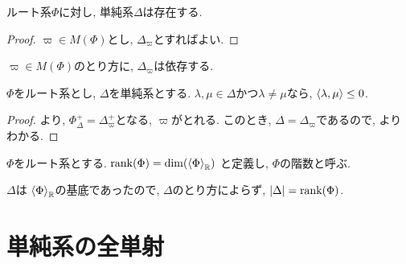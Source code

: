 \begin{cor}
  ルート系$\Phi$に対し, 単純系$\Delta$は存在する.
\end{cor}
\begin{proof}
  $\varpi\in M(\Phi)$とし, $\Delta_\varpi$とすればよい.
\end{proof}
\begin{remark}
  $\varpi\in M(\Phi)$のとり方に, $\Delta_\varpi$は依存する.
\end{remark}

\begin{theorem}
  $\Phi$をルート系とし,
  $\Delta$を単純系とする.
  $\lambda,\mu\in\Delta$かつ$\lambda\neq \mu$なら, $\Braket{\lambda,\mu}\leq 0$.
  
\end{theorem}
\begin{proof}
  より,
  $\Phi_\Delta^+=\Delta_\varpi^+$となる, $\varpi$がとれる.
  このとき, $\Delta=\Delta_\varpi$であるので,
  よりわかる.
\end{proof}



\begin{definition}
  $\Phi$をルート系とする.
  $\operatorname{rank}(\Phi)=\dim(\Braket{\Phi}_{\mathbb{R}})$
  と定義し, $\Phi$の階数と呼ぶ.
\end{definition}

\begin{remark}
  $\Delta$は
  $\Braket{\Phi}_{\mathbb{R}}$の基底であったので,
  $\Delta$のとり方によらず,
  $\left|\Delta\right|=\operatorname{rank}(\Phi)$.
\end{remark}

\section{単純系の全単射}

